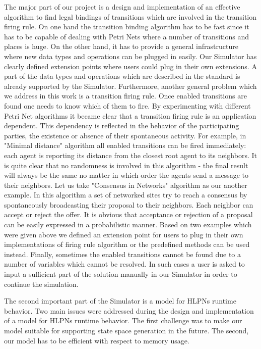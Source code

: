 The major part of our project is a design and implementation of an effective algorithm to find legal bindings of transitions which are involved in the transition firing rule. On one hand the transition binding algorithm has to be fast since it has to be capable of dealing with Petri Nets where a number of transitions and places is huge. On the other hand, it has to provide a general infrastructure where new data types and operations can be plugged in easily. Our Simulator has clearly defined extension points where users could plug in their own extensions. A part of the data types and operations which are described in the standard is already supported by the Simulator. Furthermore, another general problem which we address in this work is a transition firing rule. Once enabled transitions are found one needs to know which of them to fire. By experimenting with different Petri Net algorithms it became clear that a transition firing rule is an application dependent. This dependency is reflected in the behavior of the participating parties, the existence or absence of their spontaneous activity. For example, in "Minimal distance" algorithm \cite{min-dist} all enabled transitions can be fired immediately: each agent is reporting its distance from the closest root agent to its neighbors. It is quite clear that no randomness is involved in this algorithm - the final result will always be the same no matter in which order the agents send a message to their neighbors. Let us take "Consensus in Networks" algorithm \cite{reisig}  as our another example. In this algorithm a set of networked sites try to reach a consensus by spontaneously broadcasting their proposal to their neighbors. Each neighbor can accept or reject the offer. It is obvious that acceptance or rejection of a proposal can be easily expressed in a probabilistic manner. Based on two examples which were given above we defined an extension point for users to plug in their own implementations of firing rule algorithm or the predefined methods can be used instead. Finally, sometimes the enabled transitions cannot be found due to a number of variables which cannot be resolved. In such cases a user is asked to input a sufficient part of the solution manually in our Simulator in order to continue the simulation.

The second important part of the Simulator is a model for HLPNs runtime behavior. Two main issues were addressed during the design and implementation of a model for HLPNs runtime behavior. The first challenge was to make our model suitable for supporting state space generation in the future. The second, our model has to be efficient with respect to memory usage.

